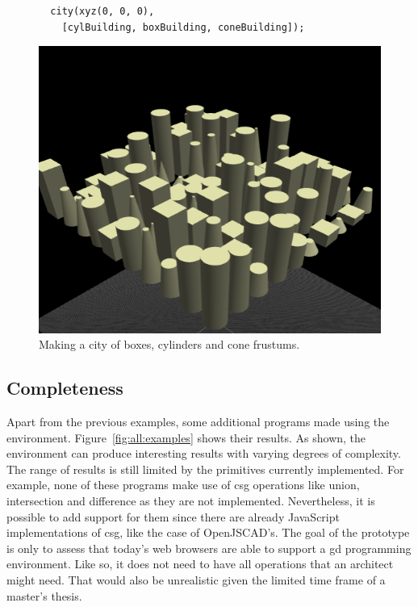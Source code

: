 \begin{figure}
\begin{minipage}{0.5\textwidth}
\begin{verbatim}
  city(xyz(0, 0, 0),
    [cylBuilding, boxBuilding, coneBuilding]);
\end{verbatim}
\end{minipage}%
\begin{minipage}{0.5\textwidth}
  \includegraphics[width=1.0\textwidth]{./images/detail_examples/box_cyl_city_higher_crop}
\end{minipage}
\caption{Making a city of boxes, cylinders and cone frustums.}
\label{fig:cyl:box:cone:city}
\end{figure}


\subsection{Completeness}
Apart from the previous examples, some additional programs made using the environment.
Figure~\ref{fig:all:examples} shows their results.
As shown, the environment can produce interesting results with varying degrees of complexity.
The range of results is still limited by the primitives currently implemented.
For example, none of these programs make use of \gls{csg} operations like union, intersection and difference as they are not implemented.
Nevertheless, it is possible to add support for them since there are already JavaScript implementations of \gls{csg}, like the case of OpenJSCAD's.
The goal of the prototype is only to assess that today's web browsers are able to support a \gls{gd} programming environment.
Like so, it does not need to have all operations that an architect might need.
That would also be unrealistic given the limited time frame of a master's thesis.


